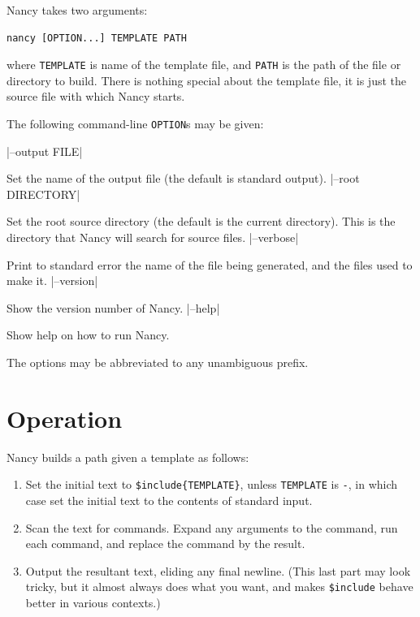 \documentclass[a4paper,english]{scrartcl}
\begin{document}
Nancy takes two arguments:

\begin{verbatim}
nancy [OPTION...] TEMPLATE PATH
\end{verbatim}

\noindent where \verb|TEMPLATE| is name of the template file, and \verb|PATH| is the path of the file or directory to build. There is nothing special about the template file, it is just the source file with which Nancy starts.

The following command-line \verb|OPTION|s may be given:

\begin{description}
|--output FILE|
\item[\UseVerb{output}]Set the name of the output file (the default is standard output).
|--root DIRECTORY|
\item[\UseVerb{root}]Set the root source directory (the default is the current directory). This is the directory that Nancy will search for source files.
|--verbose|
\item[\UseVerb{verbose}]Print to standard error the name of the file being generated, and the files used to make it.
|--version|
\item[\UseVerb{version}]Show the version number of Nancy.
|--help|
\item[\UseVerb{help}]Show help on how to run Nancy.
\end{description}

The options may be abbreviated to any unambiguous prefix.

\section{Operation}
\label{operation}

Nancy builds a path given a template as follows:

\begin{enumerate}
\item Set the initial text to \verb|$include{TEMPLATE}|, unless \verb|TEMPLATE| is \verb|-|, in which case set the initial text to the contents of standard input.
\item Scan the text for commands. Expand any arguments to the command, run each command, and replace the command by the result.
\item Output the resultant text, eliding any final newline. (This last part may look tricky, but it almost always does what you want, and makes \verb|$include| behave better in various contexts.)
\end{enumerate}
\end{document}
